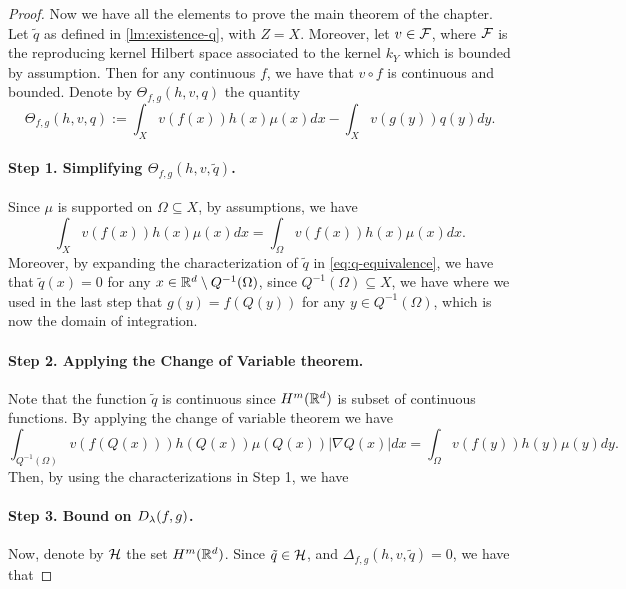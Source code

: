 \begin{proof}
Now we have all the elements to prove the main theorem of the chapter. Let $\tilde{q}$ as defined in \cref{lm:existence-q}, with $Z = X$. Moreover, let
$v \in {\cal F}$, where ${\cal F}$ is the reproducing kernel Hilbert space associated to the kernel $k_Y$ which is bounded by assumption. Then for any continuous $f$, we have that $v \circ f$ is continuous and bounded.
Denote by $\Theta_{f,g}(h,v,q)$ the quantity
$$\Theta_{f,g}(h,v,q) := \int_X v(f(x)) h(x) \mu(x) dx - \int_X v(g(y)) q(y) dy.$$
%
\paragraph{Step 1. Simplifying $\Theta_{f,g}(h,v,\tilde{q})$.}
Since $\mu$ is supported on $\Omega \subseteq X$, by assumptions, we have
$$\int_X v(f(x)) h(x) \mu(x) dx = \int_\Omega v(f(x)) h(x) \mu(x) dx.$$
Moreover, by expanding the characterization of $\tilde{q}$ in \cref{eq:q-equivalence}, we have that $\tilde{q}(x) = 0$ for any $x \in \mathbb R^d \setminus Q^{-1}(\Omega)$, since $Q^{-1}(\Omega) \subseteq X$, we have
where we used in the last step that $g(y) = f(Q(y))$ for any $y \in Q^{-1}(\Omega)$, which is now the domain of integration.
%
\paragraph{Step 2. Applying the Change of Variable theorem.}
Note that the function $\tilde{q}$ is continuous since $H^m(\mathbb R^d)$ is subset of continuous functions. By applying the change of variable theorem we have
$$\int_{Q^{-1}(\Omega)} v(f(Q(x))) h(Q(x)) \mu(Q(x)) |\nabla Q(x)| dx = \int_{\Omega} v(f(y)) h(y) \mu(y) dy.$$
Then, by using the characterizations in Step 1, we have

\paragraph{Step 3. Bound on $D_\lambda(f, g)$.}
Now, denote by $\mathcal H$ the set $H^m(\mathbb R^d)$. Since $\tilde{q} \in \mathcal H$, and $\Delta_{f, g}(h,v,\tilde{q}) = 0$, we have that


\end{proof}
